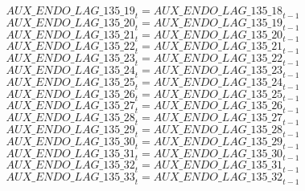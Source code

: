 \begin{dmath}
{AUX\_ENDO\_LAG\_135\_19}_{t}={AUX\_ENDO\_LAG\_135\_18}_{t-1}
\end{dmath}
\begin{dmath}
{AUX\_ENDO\_LAG\_135\_20}_{t}={AUX\_ENDO\_LAG\_135\_19}_{t-1}
\end{dmath}
\begin{dmath}
{AUX\_ENDO\_LAG\_135\_21}_{t}={AUX\_ENDO\_LAG\_135\_20}_{t-1}
\end{dmath}
\begin{dmath}
{AUX\_ENDO\_LAG\_135\_22}_{t}={AUX\_ENDO\_LAG\_135\_21}_{t-1}
\end{dmath}
\begin{dmath}
{AUX\_ENDO\_LAG\_135\_23}_{t}={AUX\_ENDO\_LAG\_135\_22}_{t-1}
\end{dmath}
\begin{dmath}
{AUX\_ENDO\_LAG\_135\_24}_{t}={AUX\_ENDO\_LAG\_135\_23}_{t-1}
\end{dmath}
\begin{dmath}
{AUX\_ENDO\_LAG\_135\_25}_{t}={AUX\_ENDO\_LAG\_135\_24}_{t-1}
\end{dmath}
\begin{dmath}
{AUX\_ENDO\_LAG\_135\_26}_{t}={AUX\_ENDO\_LAG\_135\_25}_{t-1}
\end{dmath}
\begin{dmath}
{AUX\_ENDO\_LAG\_135\_27}_{t}={AUX\_ENDO\_LAG\_135\_26}_{t-1}
\end{dmath}
\begin{dmath}
{AUX\_ENDO\_LAG\_135\_28}_{t}={AUX\_ENDO\_LAG\_135\_27}_{t-1}
\end{dmath}
\begin{dmath}
{AUX\_ENDO\_LAG\_135\_29}_{t}={AUX\_ENDO\_LAG\_135\_28}_{t-1}
\end{dmath}
\begin{dmath}
{AUX\_ENDO\_LAG\_135\_30}_{t}={AUX\_ENDO\_LAG\_135\_29}_{t-1}
\end{dmath}
\begin{dmath}
{AUX\_ENDO\_LAG\_135\_31}_{t}={AUX\_ENDO\_LAG\_135\_30}_{t-1}
\end{dmath}
\begin{dmath}
{AUX\_ENDO\_LAG\_135\_32}_{t}={AUX\_ENDO\_LAG\_135\_31}_{t-1}
\end{dmath}
\begin{dmath}
{AUX\_ENDO\_LAG\_135\_33}_{t}={AUX\_ENDO\_LAG\_135\_32}_{t-1}
\end{dmath}
